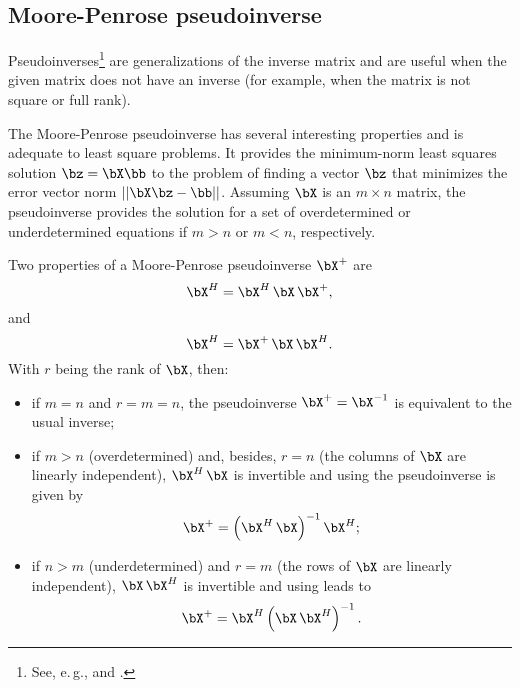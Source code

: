 \subsection{Moore-Penrose pseudoinverse}
\label{sec:pseudoinverse}

Pseudoinverses\footnote{See, e.\,g.,  and .} are generalizations of the inverse matrix and are useful when the given matrix does not have an inverse (for example, when the matrix is not square or full rank).

The Moore-Penrose pseudoinverse has several interesting properties and is adequate to least square problems. It provides the minimum-norm least squares solution $\bz = \bX \bb$ to the problem of finding a vector $\bz$ that minimizes the error vector norm $||\bX \bz - \bb ||$.
Assuming $\bX$ is an $m \times n$ matrix, the pseudoinverse provides the solution for a set of overdetermined or underdetermined equations if $m>n$ or $m<n$, respectively.

Two properties of a Moore-Penrose pseudoinverse $\bX^+$ are
\begin{equation}
\bX^H = \bX^H \, \bX \, \bX^+,
\label{eq:pinv_over}
\end{equation}
and
\begin{equation}
\bX^H = \bX^+ \, \bX \, \bX^H.
\label{eq:pinv_under}
\end{equation}
With $r$ being the rank of $\bX$, then:
\begin{itemize}
	\item if $m=n$ and $r=m=n$, the pseudoinverse $\bX^+ = \bX^{-1}$ is equivalent to the usual inverse;
	\item if $m>n$ (overdetermined) and, besides, $r=n$ (the columns of $\bX$ are linearly independent), $\bX^H \, \bX$ is invertible and using  the pseudoinverse is given by
		\begin{equation}
\bX^+ = \left( \bX^H \, \bX \right)^{-1}  \bX^H;
\label{eq:pseudoInverseOver}	
\end{equation}
	\item if $n>m$ (underdetermined) and $r=m$ (the rows of $\bX$ are linearly independent), $\bX \, \bX^H$ is invertible and using  leads to
		\begin{equation}
\bX^+ =   \bX^H \left( \bX \, \bX^H \right)^{-1}.
\label{eq:pseudoInverseUnder}	
\end{equation}
\end{itemize}

